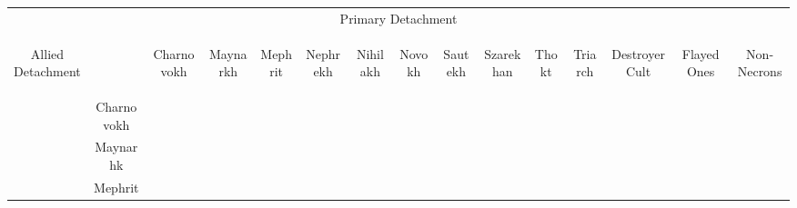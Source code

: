 \label{allies}
\begin{tabular}{||c c c c c c c c c c c c c c c||}
	\hline
	\multicolumn{15}{||c||}{Primary Detachment} \\
	\multirow{14}{*}{\begin{sideways}Allied Detachment\end{sideways}} & & \begin{sideways}Charnovokh \end{sideways} & \begin{sideways}Maynarkh \end{sideways} & \begin{sideways}Mephrit \end{sideways} & \begin{sideways}Nephrekh \end{sideways} & \begin{sideways}Nihilakh \end{sideways} & \begin{sideways}Novokh \end{sideways} & \begin{sideways}Sautekh \end{sideways} & \begin{sideways}Szarekhan \end{sideways} & \begin{sideways}Thokt \end{sideways} & \begin{sideways}Triarch \end{sideways} & \begin{sideways}Destroyer Cult \end{sideways} & \begin{sideways}Flayed Ones \end{sideways} & \begin{sideways}Non-Necrons \end{sideways}\\
	& Charnovokh & & \greyskull & \blackskull & \blackskull & \blackskull & \blackskull & \blackskull & \redskull & \blackskull & \blackskull & \greyskull & \redskull & \redskull \\
	& Maynarhk & \greyskull & & \greyskull & \greyskull & \redskull & \blackskull & \greyskull & \blackskull & \greyskull & \blackskull & \blackskull & \blackskull & \redskull \\
	& Mephrit & \blackskull & \greyskull & & \greyskull & \greyskull  & \blackskull & \redskull & \yellowskull & \blackskull & \blackskull & \greyskull & \redskull & \redskull \\

\end{tabular}
